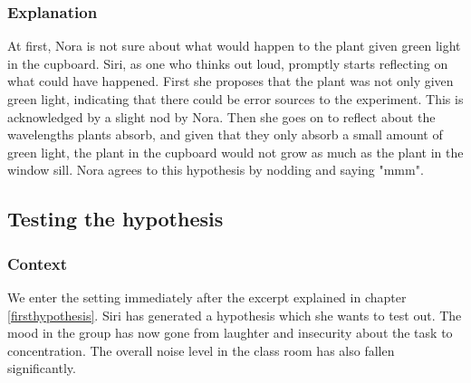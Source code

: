 \subsubsection*{Explanation}
At first, Nora is not sure about what would happen to the plant given green light in the cupboard. Siri, as one who thinks out loud, promptly starts reflecting on what could have happened. First she proposes that the plant was not only given green light, indicating that there could be error sources to the experiment. This is acknowledged by a slight nod by Nora. Then she goes on to reflect about the wavelengths plants absorb, and given that they only absorb a small amount of green light, the plant in the cupboard would not grow as much as the plant in the window sill. Nora agrees to this hypothesis by nodding and saying "mmm". 



\subsection{Testing the hypothesis}

\subsubsection*{Context}
We enter the setting immediately after the excerpt explained in chapter \ref{firsthypothesis}. Siri has generated a hypothesis which she wants to test out. The mood in the group has now gone from laughter and insecurity about the task to concentration. The overall noise level in the class room has also fallen significantly. 

